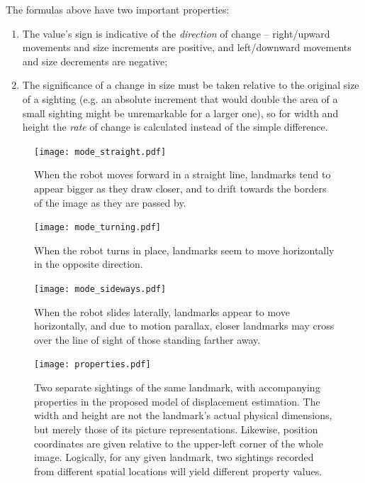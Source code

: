 \documentclass[twocolumn, 9pt]{jsproceedings}
\begin{document}
The formulas above have two important properties:

\begin{enumerate}
\item The value's sign is indicative of the {\it direction} of change -- right/upward movements and size increments are positive, and left/downward movements and size decrements are negative;
\item The significance of a change in size must be taken relative to the original size of a sighting (e.g. an absolute increment that would double the area of a small sighting might be unremarkable for a larger one), so for width and height the {\it rate} of change is calculated instead of the simple difference.
\end{enumerate}

\begin{figure}[h!]
\texttt{[image: mode\_straight.pdf]}
\caption{When the robot moves forward in a straight line, landmarks tend to appear bigger as they draw closer, and to drift towards the borders of the image as they are passed by.}
\label{fig:mode_straight}
\end{figure}

\begin{figure}[h!]
\texttt{[image: mode\_turning.pdf]}
\caption{When the robot turns in place, landmarks seem to move horizontally in the opposite direction.}
\label{fig:mode_turning}
\end{figure}

\begin{figure}[h!]
\texttt{[image: mode\_sideways.pdf]}
\caption{When the robot slides laterally, landmarks appear to move horizontally, and due to motion parallax, closer landmarks may cross over the line of sight of those standing farther away.}
\label{fig:mode_sideways}
\end{figure}

\begin{figure}[h!]
\texttt{[image: properties.pdf]}
\caption{Two separate sightings of the same landmark, with accompanying properties in the proposed model of displacement estimation. The width and height are not the landmark's actual physical dimensions, but merely those of its picture representations. Likewise, position coordinates are given relative to the upper-left corner of the whole image. Logically, for any given landmark, two sightings recorded from different spatial locations will yield different property values.}
\label{fig:properties}
\end{figure}
\end{document}
